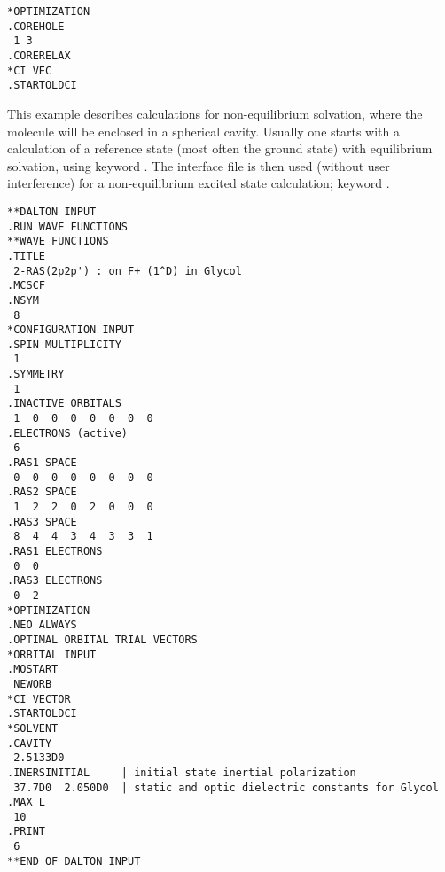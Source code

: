 \begin{verbatim}
*OPTIMIZATION
.COREHOLE
 1 3
.CORERELAX
*CI VEC
.STARTOLDCI
\end{verbatim}
\label{sirius_ex7}

\begin{center}
\end{center}

This example describes calculations for non-equilibrium
solvation, where the mole\-cule will
be enclosed in a spherical cavity. Usually one starts
with a calculation of a reference state (most often the ground
state) with equilibrium solvation, using keyword . The
interface file is then used (without user interference) for a
non-equilibrium excited state calculation; keyword .

\begin{verbatim}
**DALTON INPUT
.RUN WAVE FUNCTIONS
**WAVE FUNCTIONS
.TITLE
 2-RAS(2p2p') : on F+ (1^D) in Glycol
.MCSCF
.NSYM
 8
*CONFIGURATION INPUT
.SPIN MULTIPLICITY
 1
.SYMMETRY
 1
.INACTIVE ORBITALS
 1  0  0  0  0  0  0  0
.ELECTRONS (active)
 6
.RAS1 SPACE
 0  0  0  0  0  0  0  0
.RAS2 SPACE
 1  2  2  0  2  0  0  0
.RAS3 SPACE
 8  4  4  3  4  3  3  1
.RAS1 ELECTRONS
 0  0
.RAS3 ELECTRONS
 0  2
*OPTIMIZATION
.NEO ALWAYS
.OPTIMAL ORBITAL TRIAL VECTORS
*ORBITAL INPUT
.MOSTART
 NEWORB
*CI VECTOR
.STARTOLDCI
*SOLVENT
.CAVITY
 2.5133D0
.INERSINITIAL     | initial state inertial polarization
 37.7D0  2.050D0  | static and optic dielectric constants for Glycol
.MAX L
 10
.PRINT
 6
**END OF DALTON INPUT
\end{verbatim}
\label{sirius_ex8}

